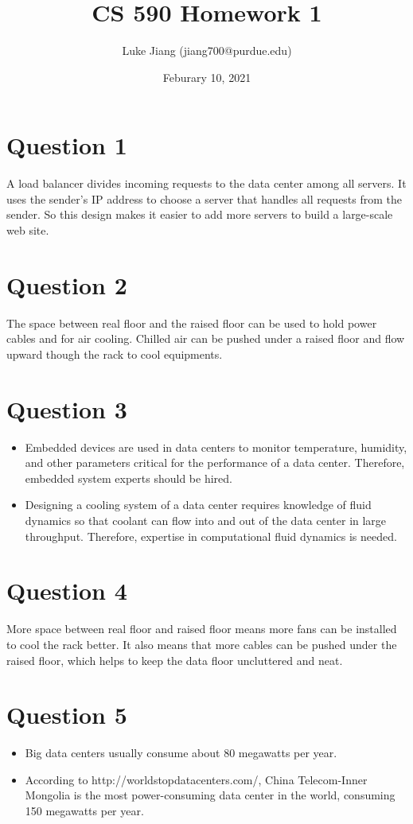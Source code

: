 \documentclass{article}
\title{CS 590 Homework 1}
\author{Luke Jiang (jiang700@purdue.edu) }
\date{Feburary 10, 2021}
\begin{document}
\maketitle

\section{Question 1}
A load balancer divides incoming requests to the data center among all servers. It uses the sender's IP address to choose a server that handles all requests from the sender. So this design makes it easier to add more servers to build a large-scale web site.

\section{Question 2}
The space between real floor and the raised floor can be used to hold power cables and for air cooling. Chilled air can be pushed under a raised floor and flow upward though the rack to cool equipments.

\section{Question 3}
\begin{itemize}
\item Embedded devices are used in data centers to monitor temperature, humidity, and other parameters critical for the performance of a data center. Therefore, embedded system experts should be hired.
\item Designing a cooling system of a data center requires knowledge of fluid dynamics so that coolant can flow into and out of the data center in large throughput. Therefore, expertise in computational fluid dynamics is needed.
\end{itemize}

\section{Question 4}
More space between real floor and raised floor means more fans can be installed to cool the rack better. It also means that more cables can be pushed under the raised floor, which helps to keep the data floor uncluttered and neat.

\section{Question 5}
\begin{itemize}
\item Big data centers usually consume about 80 megawatts per year.
\item According to http://worldstopdatacenters.com/, China Telecom-Inner Mongolia is the most power-consuming data center in the world, consuming 150 megawatts per year.
\end{itemize}
\end{document}
